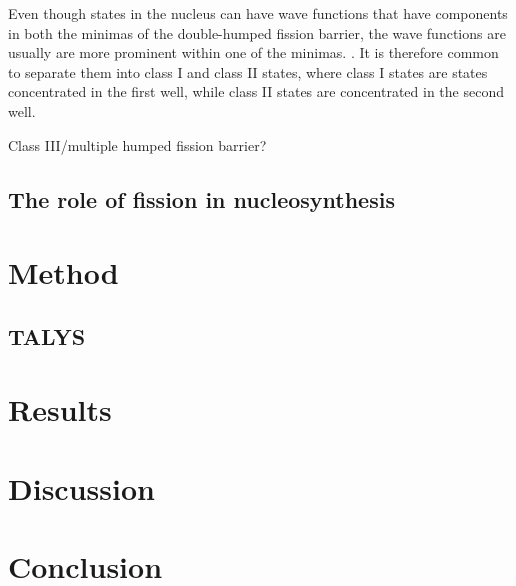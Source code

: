 \documentclass[]{article}
\begin{document}
\noindent Even though states in the nucleus can have wave functions that have components in both the minimas of the double-humped fission barrier, the wave functions are usually are more prominent within one of the minimas. \cite{Wagemas1991}. It is therefore common to separate them into class I and class II states, where class I states are states concentrated in the first well, while class II states are concentrated in the second well. 

Class III/multiple humped fission barrier?
\subsection{The role of fission in nucleosynthesis}


\section{Method}

\subsection{TALYS}


\section{Results}

\section{Discussion}

\section{Conclusion}



 
\end{document}
